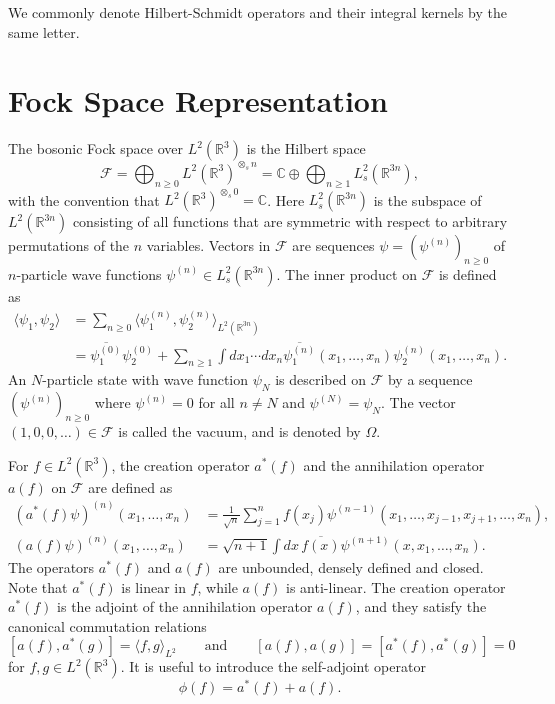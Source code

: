 \documentclass[11pt,a4paper,draft,DIV11]{scrartcl}	%
\newcommand{\R}{\mathds{R}}
\begin{document}
We commonly denote Hilbert-Schmidt operators and their integral kernels by the same letter.

\section{Fock Space Representation}
\label{s:fock}
The bosonic Fock space over $L^2(\R^3)$ is the Hilbert space
\[
  \mathcal{F} = \bigoplus_{n \ge 0} L^2(\R^3)^{\otimes_s n} = \mathds{C}
  \oplus \bigoplus_{n \ge 1} L^2_s(\R^{3n}),
\]
with the convention that $L^2(\R^3)^{\otimes_s 0} = \mathds{C}$. Here
$L^2_s(\R^{3n})$ is the subspace of $L^2(\R^{3n})$ consisting of all functions
that are symmetric with respect to arbitrary permutations of the $n$
variables. Vectors in $\mathcal{F}$ are sequences $\psi = (\psi^{(n)})_{n
\ge 0}$ of $n$-particle wave functions $\psi^{(n)} \in L^2_s(\R^{3n})$. The
inner product on $\mathcal{F}$ is defined as
\begin{align*}
  \langle \psi_1, \psi_2 \rangle & = \sum_{n \ge 0} \langle \psi_1^{(n)},
  \psi_2^{(n)} \rangle_{L^2(\R^{3n})} \\
  & = \overline{\psi_1^{(0)}} \psi_2^{(0)} + \sum_{n \ge 1} \int dx_1 \cdots
  dx_n \overline{\psi_1^{(n)}}(x_1, \dots, x_n) \psi_2^{(n)}(x_1, \dots, x_n).
\end{align*}
An $N$-particle state with wave function $\psi_N$ is described on
$\mathcal{F}$ by a sequence $(\psi^{(n)})_{n \ge 0}$ where $\psi^{(n)} =
0$ for all $n \neq N$ and $\psi^{(N)} = \psi_N$. The vector $(1, 0, 0, \dots
) \in \mathcal{F}$ is called the vacuum, and is denoted by $\Omega$.


For $f \in L^2(\R^3)$, the creation operator $a^*(f)$ and the annihilation
operator $a(f)$ on $\mathcal{F}$ are defined as
\[
  \begin{split}
    (a^*(f) \psi)^{(n)}(x_1, \dots, x_n) & = \frac{1}{\sqrt{n}} \sum_{j=1}^n
    f(x_j) \psi^{(n-1)}(x_1, \dots, x_{j-1}, x_{j+1}, \dots, x_n), \\
    (a(f) \psi)^{(n)}(x_1, \dots, x_n) & = \sqrt{n+1} \int dx \,
    \overline{f(x)} \psi^{(n+1)}(x, x_1, \dots, x_n).
  \end{split}
\]
The operators $a^*(f)$ and $a(f)$ are unbounded, densely defined and closed.
Note that $a^*(f)$ is linear in $f$, while $a(f)$ is anti-linear. The creation
operator $a^*(f)$ is the adjoint of the annihilation operator $a(f)$, and
they satisfy the canonical commutation relations
\[
  [a(f), a^*(g)] = \langle f, g \rangle_{L^2} \qquad \text{and} \qquad [a(f),
  a(g)] = [a^*(f), a^*(g)] = 0
\]
for $f,g \in L^2(\R^3)$. It is useful to introduce the self-adjoint operator
\[
  \phi(f) = a^*(f) + a(f).
\]
\end{document}
